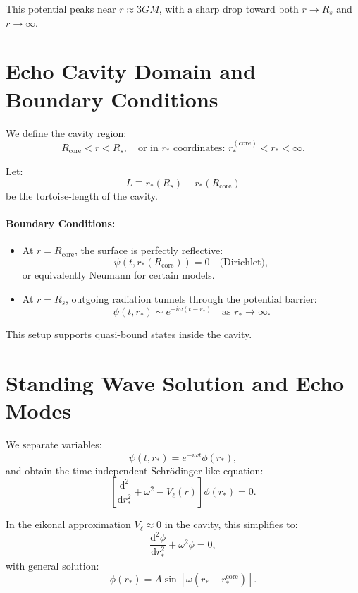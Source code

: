 \documentclass[a4paper, 12pt, oneside]{book}
\numberwithin{equation}{chapter}
\begin{document}
This potential peaks near \( r \approx 3GM \), with a sharp drop toward both \( r \to R_s \) and \( r \to \infty \).

\section[Echo Cavity Domain]{Echo Cavity Domain and Boundary Conditions}
\label{sec:CavityBC}

We define the cavity region:
\[
    R_{\text{core}} < r < R_s,
    \quad \text{or in } r_* \text{ coordinates: } r_*^{(\text{core})} < r_* < \infty.
\]

Let:
\[
    L \equiv r_*(R_s) - r_*(R_{\text{core}})
\]
be the tortoise-length of the cavity.

\paragraph{Boundary Conditions:}
\begin{itemize}
  \item At \( r = R_{\text{core}} \), the surface is perfectly reflective:
  \[
      \psi(t, r_*(R_{\text{core}})) = 0 \quad \text{(Dirichlet)},
  \]
  or equivalently Neumann for certain models.

  \item At \( r = R_s \), outgoing radiation tunnels through the potential barrier:
  \[
      \psi(t, r_*) \sim e^{-i\omega(t - r_*)} \quad\text{as } r_* \to \infty.
  \]
\end{itemize}

This setup supports quasi-bound states inside the cavity.

\section[Standing Wave Solution]{Standing Wave Solution and Echo Modes}
\label{sec:EchoModes}

We separate variables:
\[
    \psi(t, r_*) = e^{-i\omega t} \phi(r_*),
\]
and obtain the time-independent Schrödinger-like equation:
\[
    \left[
        \frac{\mathrm{d}^2}{\mathrm{d} r_*^2}
        + \omega^2 - V_\ell(r)
    \right]
    \phi(r_*) = 0.
\]

In the eikonal approximation \( V_\ell \approx 0 \) in the cavity, this simplifies to:
\[
    \frac{\mathrm{d}^2 \phi}{\mathrm{d} r_*^2} + \omega^2 \phi = 0,
\]
with general solution:
\[
    \phi(r_*) = A \sin[\omega (r_* - r_*^{\text{core}})].
\]
\end{document}
